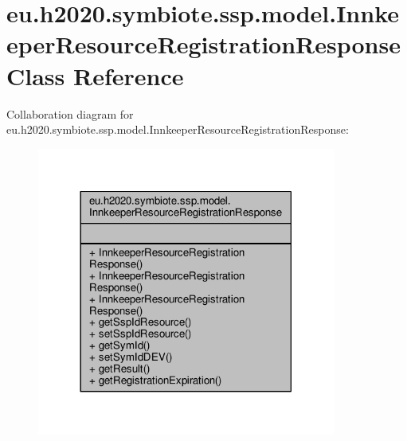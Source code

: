 \hypertarget{classeu_1_1h2020_1_1symbiote_1_1ssp_1_1model_1_1InnkeeperResourceRegistrationResponse}{}\section{eu.\+h2020.\+symbiote.\+ssp.\+model.\+Innkeeper\+Resource\+Registration\+Response Class Reference}
\label{classeu_1_1h2020_1_1symbiote_1_1ssp_1_1model_1_1InnkeeperResourceRegistrationResponse}


Collaboration diagram for eu.\+h2020.\+symbiote.\+ssp.\+model.\+Innkeeper\+Resource\+Registration\+Response\+:\nopagebreak
\begin{figure}[H]
\begin{center}
\leavevmode
\includegraphics[width=278pt]{classeu_1_1h2020_1_1symbiote_1_1ssp_1_1model_1_1InnkeeperResourceRegistrationResponse__coll__graph}
\end{center}
\end{figure}

